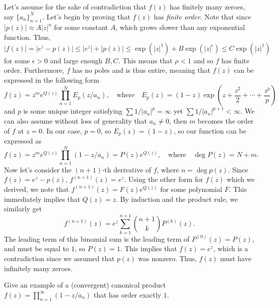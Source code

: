 \documentclass{pset}
\begin{document}
\begin{solution}
  Let's assume for the sake of contradiction that $f(z)$ has finitely many zeroes, say $\{a_n\}_{n=1}^N$. Let's begin by proving that $f(z)$ has \emph{finite order}. Note that since $|p(z)|\approx A|z|^n$ for some constant $A$, which grows slower than any exponential function. Thus,
  \[
    |f(z)| = |e^z-p(z)| \leq |e^z| + |p(z)| \leq \exp(|z|^1) + B\exp(|z|^{\epsilon}) \leq C\exp(|z|^1)
  \]
  for some $\epsilon>0$ and large enough $B,C$. This means that $\rho < 1$ and so $f$ has finite order. Furthermore, $f$ has no poles and is thus entire, meaning that $f(z)$ can be expressed in the following form
  \[
    f(z) = z^m e^{Q(z)}\prod^N_{n=1} E_p(z/a_n), \quad \textrm{where}\quad E_p(z) = (1-z)\exp\left(z+\frac{z^2}{2}+\cdots+\frac{z^p}{p}\right)
  \]
  and $p$ is some unique integer satisfying $\sum 1/|a_n|^p = \infty$ yet $\sum 1/|a_n|^{p+1} < \infty$. We can also assume without loss of generality that $a_n\neq 0$, then $m$ becomes the order of $f$ at $z=0$. In our case, $p=0$, so $E_p(z)=(1-z)$, so our function can be expressed as
  \[
    f(z) = z^m e^{Q(z)} \prod^N_{n=1} (1-z/a_n) = P(z)e^{Q(z)}, \quad \textrm{where}\quad \deg P(z) = N+m.
  \]
  Now let's consider the $(n+1)$-th derivative of $f$, where $n=\deg p(z)$. Since $f(z)=e^z-p(z)$, $f^{(n+1)}(z) =e^z$. Using the other form for $f(z)$ which we derived, we note that $f^{(n+1)}(z) = F(z)e^{Q(z)}$ for some polynomial $F$. This immediately implies that $Q(z)=z$. By induction and the product rule, we similarly get
  \[
    f^{(n+1)}(z) = e^z\sum^{n+1}_{k=1} \binom{n+1}{k} P^{(k)}(z).
  \]
  The leading term of this binomial sum is the leading term of $P^{(0)}(z)=P(z)$, and must be equal to $1$, so $P(z)=1$. This implies that $f(z)=e^z$, which is a contradiction since we assumed that $p(z)$ was nonzero. Thus, $f(z)$ must have infinitely many zeroes.
\end{solution}

\begin{problem}{3.6}
  Give an example of a (convergent) canonical product $f(z) = \prod^\infty_{n=1}(1-z/a_n)$ that has order exactly $1$.
\end{problem}
\end{document}
